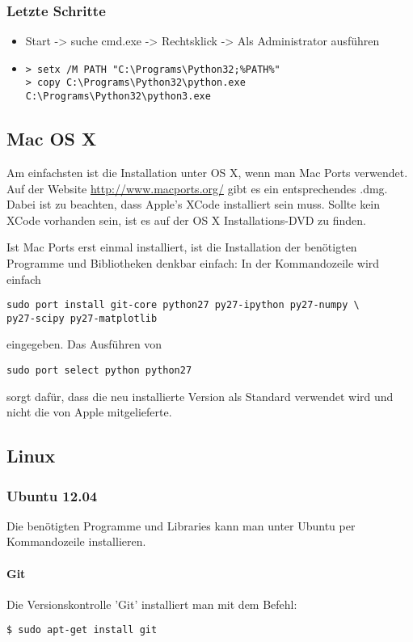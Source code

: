 \subsubsection{Letzte Schritte}
\begin{itemize}
  \item Start -> suche cmd.exe -> Rechtsklick -> Als Administrator ausführen
  \item
\begin{verbatim}
> setx /M PATH "C:\Programs\Python32;%PATH%"
> copy C:\Programs\Python32\python.exe C:\Programs\Python32\python3.exe
\end{verbatim}
\end{itemize}


\subsection{Mac OS X}
Am einfachsten ist die Installation unter OS X, wenn man Mac Ports verwendet.
Auf der Website \url{http://www.macports.org/} gibt es ein entsprechendes .dmg.
Dabei ist zu beachten, dass Apple's XCode installiert sein muss.
Sollte kein XCode vorhanden sein, ist es auf der OS X Installations-DVD zu finden.

Ist Mac Ports erst einmal installiert, ist die Installation der benötigten Programme und Bibliotheken denkbar einfach: In der Kommandozeile wird einfach
\begin{verbatim}
sudo port install git-core python27 py27-ipython py27-numpy \
py27-scipy py27-matplotlib
\end{verbatim}
eingegeben.
Das Ausführen von
\begin{verbatim}
sudo port select python python27
\end{verbatim}
sorgt dafür, dass die neu installierte Version als Standard verwendet wird und nicht die von Apple mitgelieferte.

\subsection{Linux}
\subsubsection{Ubuntu 12.04}
Die benötigten Programme und Libraries kann man unter Ubuntu per Kommandozeile installieren.

\paragraph{Git}
Die Versionskontrolle 'Git' installiert man mit dem Befehl:
\begin{verbatim}
$ sudo apt-get install git
\end{verbatim}

